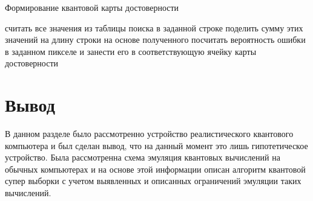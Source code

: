\begin{algorithm}
	\caption{Формирование квантовой карты достоверности}
	\label{alg:map}
	\begin{algorithmic}[1]
		\State считать все значения из таблицы поиска в заданной строке
		\State поделить сумму этих значений на длину строки
		\State на основе полученного посчитать вероятность ошибки в заданном пикселе и занести его в соответствующую ячейку карты достоверности
	\end{algorithmic}
\end{algorithm}

\section*{Вывод}

В данном разделе было рассмотренно устройство реалистического квантового компьютера и был сделан вывод, что на данный момент это лишь гипотетическое устройство. Была рассмотренна схема эмуляция квантовых вычислений на обычных компьютерах и на основе этой информации описан алгоритм квантовой супер выборки с учетом выявленных и описанных ограничений эмуляции таких вычислений.
